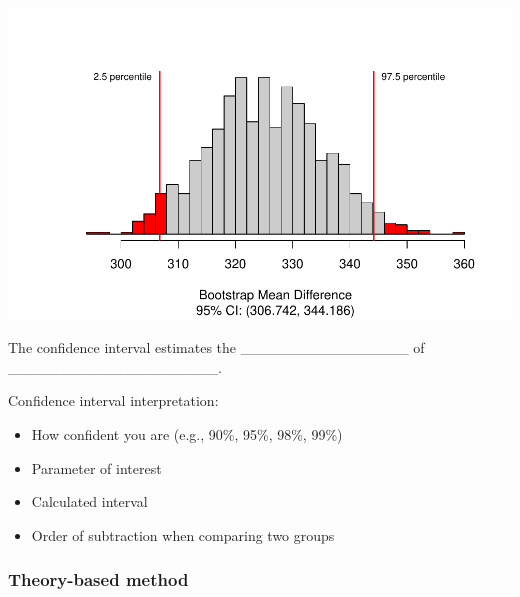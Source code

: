 \documentclass[
]{report}
\newenvironment{Shaded}{\begin{snugshade}}{\end{snugshade}}
\newcommand{\AttributeTok}[1]{\textcolor[rgb]{0.77,0.63,0.00}{#1}}
\newcommand{\CommentTok}[1]{\textcolor[rgb]{0.56,0.35,0.01}{\textit{#1}}}
\newcommand{\DecValTok}[1]{\textcolor[rgb]{0.00,0.00,0.81}{#1}}
\newcommand{\FloatTok}[1]{\textcolor[rgb]{0.00,0.00,0.81}{#1}}
\newcommand{\FunctionTok}[1]{\textcolor[rgb]{0.00,0.00,0.00}{#1}}
\newcommand{\NormalTok}[1]{#1}
\newcommand{\SpecialCharTok}[1]{\textcolor[rgb]{0.00,0.00,0.00}{#1}}
\begin{document}
\begin{Shaded}
\end{Shaded}

\begin{center}\includegraphics[width=0.7\linewidth]{11-LN011-paired_files/figure-latex/unnamed-chunk-4-1} \end{center}

The confidence interval estimates the \_\_\_\_\_\_\_\_\_\_\_\_\_\_\_\_
of \_\_\_\_\_\_\_\_\_\_\_\_\_\_\_\_\_\_\_\_.

Confidence interval interpretation:

\begin{itemize}
\item
  How confident you are (e.g., 90\%, 95\%, 98\%, 99\%)
\item
  Parameter of interest
\item
  Calculated interval
\item
  Order of subtraction when comparing two groups
\end{itemize}

\vspace{0.8in}

\newpage

\hypertarget{theory-based-method-1}{%
\subsubsection*{Theory-based method}\label{theory-based-method-1}}
\end{document}

